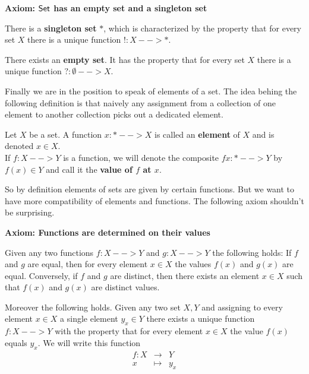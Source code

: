 	\begin{mdframed}[skipabove=1em, skipbelow=1em]
		\textbf{Axiom: $\textsf{Set}$ has an empty set and a singleton set}

		There is a \textbf{singleton set} $*$, which is characterized by the property that for every set $X$ there is a unique function $!:X --> *$.

		There exists an \textbf{empty set}. It has the property that for every set $X$ there is a unique function $?:\emptyset --> X$. 
	\end{mdframed}

	Finally we are in the position to speak of elements of a set. The idea behing the following definition is that naively any assignment from a collection of one element to another collection picks out a dedicated element.

	\begin{definition}
		Let $X$ be a set. A function $x:* --> X$ is called an \textbf{element} of $X$ and is denoted $x \in X$.\\
		If $f:X-->Y$ is a function, we will denote the composite $fx:*-->Y$ by $f(x) \in Y$ and call it the \textbf{value of $f$ at $x$}. 
	\end{definition}

	So by definition elements of sets are given by certain functions. But we want to have more compatibility of elements and functions. The following axiom shouldn't be surprising.

	\begin{mdframed}[skipabove=1em, skipbelow=1em]
		\textbf{Axiom: Functions are determined on their values}

		Given any two functions $f:X-->Y$ and $g:X-->Y$ the following holds: If $f$ and $g$ are equal, then for every element $x\in X$ the values $f(x)$ and $g(x)$ are equal. Conversely, if $f$ and $g$ are distinct, then there exists an element $x \in X$ such that $f(x)$ and $g(x)$ are distinct values.

		Moreover the following holds. Given any two set $X,Y$ and assigning to every element $x \in X$ a single element $y_x \in Y$ there exists a unique function $f:X --> Y$ with the property that for every element $x\in X$ the value $f(x)$ equals $y_x$. We will write this function
		\begin{equation*}
			\begin{array}{rcl}
				f:X & \longrightarrow & Y\\
				x & \longmapsto & y_x
			\end{array}
		\end{equation*}
	\end{mdframed}

